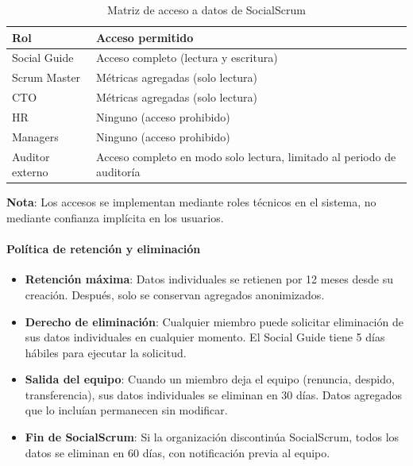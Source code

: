 \begin{table}[h]
    \centering
    \small
    \begin{tabularx}{\textwidth}{|l|X|}
        \hline
        \textbf{Rol} & \textbf{Acceso permitido}                                              \\
        \hline
        Social Guide
                     & Acceso completo (lectura y escritura)                                  \\
        \hline
        Scrum Master
                     & Métricas agregadas (solo lectura)                                      \\
        \hline
        CTO
                     & Métricas agregadas (solo lectura)                                      \\
        \hline
        HR
                     & Ninguno (acceso prohibido)                                             \\
        \hline
        Managers
                     & Ninguno (acceso prohibido)                                             \\
        \hline
        Auditor externo
                     & Acceso completo en modo solo lectura, limitado al periodo de auditoría \\
        \hline
    \end{tabularx}
    \caption{Matriz de acceso a datos de SocialScrum}
    \label{tab:matriz-acceso-socialscrum}
\end{table}
\FloatBarrier

\textbf{Nota}: Los accesos se implementan mediante roles técnicos en el sistema, no mediante confianza implícita en los usuarios.

\paragraph{Política de retención y eliminación}

\begin{itemize}
    \item \textbf{Retención máxima}: Datos individuales se retienen por 12 meses desde su creación. Después, solo se conservan agregados anonimizados.

    \item \textbf{Derecho de eliminación}: Cualquier miembro puede solicitar eliminación de sus datos individuales en cualquier momento. El Social Guide tiene 5 días hábiles para ejecutar la solicitud.

    \item \textbf{Salida del equipo}: Cuando un miembro deja el equipo (renuncia, despido, transferencia), sus datos individuales se eliminan en 30 días. Datos agregados que lo incluían permanecen sin modificar.

    \item \textbf{Fin de SocialScrum}: Si la organización discontinúa SocialScrum, todos los datos se eliminan en 60 días, con notificación previa al equipo.
\end{itemize}

